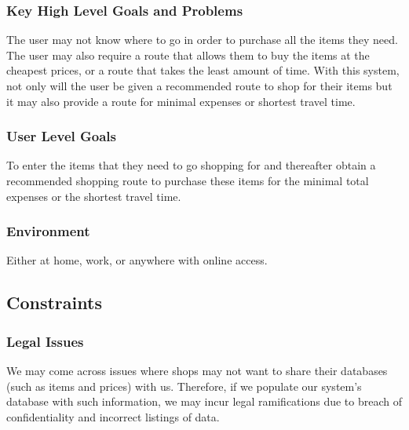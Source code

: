 \documentclass[12pt]{article}
\begin{document}
\subsubsection{Key High Level Goals and Problems}
The user may not know where to go in order to purchase all the items they need. The user may also require a route that allows them to buy the items at the cheapest prices, or a route that takes the least amount of time.
With this system, not only will the user be given a recommended route to shop for their items but it may also provide a route for minimal expenses or shortest travel time.
\subsubsection{User Level Goals}
To enter the items that they need to go shopping for and thereafter obtain a recommended shopping route to purchase these items for the minimal total expenses or the shortest travel time.
\subsubsection{Environment}
Either at home, work, or anywhere with online access.

\subsection{Constraints}
\subsubsection{Legal Issues}
We may come across issues where shops may not want to share their databases (such as items and prices) with us. Therefore, if we populate our system's database with such information, we may incur legal ramifications due to breach of confidentiality and incorrect listings of data. 
\end{document}
